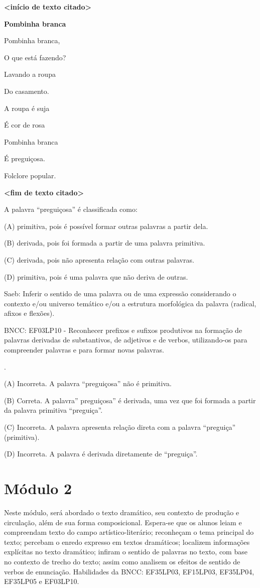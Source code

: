 \textbf{\textless{}início de texto citado\textgreater{}}

\textbf{Pombinha branca}

Pombinha branca,

O que está fazendo?

Lavando a roupa

Do casamento.

A roupa é suja

É cor de rosa

Pombinha branca

É preguiçosa.

Folclore popular.

\textbf{\textless{}fim de texto citado\textgreater{}}

A palavra ``preguiçosa'' é classificada como:

(A) primitiva, pois é possível formar outras palavras a partir dela.

(B) derivada, pois foi formada a partir de uma palavra primitiva.

(C) derivada, pois não apresenta relação com outras palavras.

(D) primitiva, pois é uma palavra que não deriva de outras.

Saeb: Inferir o sentido de uma palavra ou de uma expressão considerando
o contexto e/ou universo temático e/ou a estrutura morfológica da
palavra (radical, afixos e flexões).

BNCC: EF03LP10 - Reconhecer prefixos e sufixos produtivos na formação de
palavras derivadas de substantivos, de adjetivos e de verbos,
utilizando-os para compreender palavras e para formar novas palavras.

.

(A) Incorreta. A palavra ``preguiçosa'' não é primitiva.

(B) Correta. A palavra'' preguiçosa'' é derivada, uma vez que foi
formada a partir da palavra primitiva ``preguiça''.

(C) Incorreta. A palavra apresenta relação direta com a palavra
``preguiça'' (primitiva).

(D) Incorreta. A palavra é derivada diretamente de ``preguiça''.

\section{Módulo 2}\label{muxf3dulo-2}

Neste módulo, será abordado o texto dramático, seu contexto de produção
e circulação, além de sua forma composicional. Espera-se que os alunos
leiam e compreendam texto do campo artístico-literário; reconheçam o
tema principal do texto; percebam o enredo expresso em textos
dramáticos; localizem informações explícitas no texto dramático; infiram
o sentido de palavras no texto, com base no contexto de trecho do texto;
assim como analisem os efeitos de sentido de verbos de enunciação.
Habilidades da BNCC: EF35LP03, EF15LP03, EF35LP04, EF35LP05 e EF03LP10.

